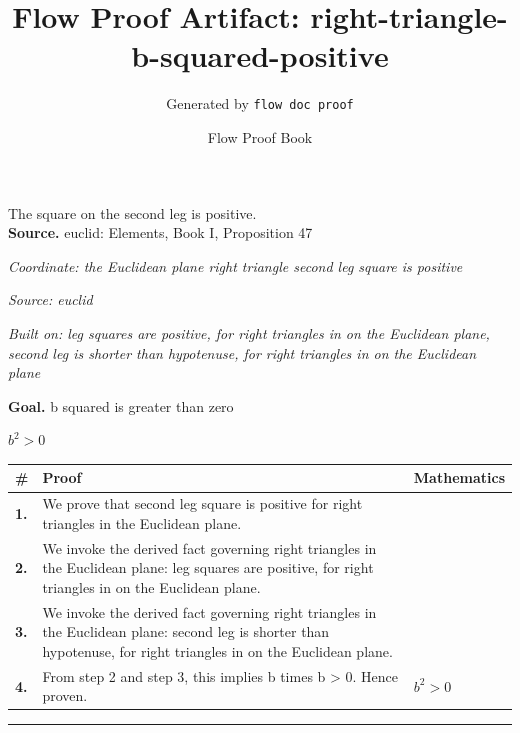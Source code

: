 \documentclass[11pt]{article}
\title{Flow Proof Artifact: right-triangle-b-squared-positive}
\author{Generated by \texttt{flow doc proof}}
\date{Flow Proof Book}
\theoremstyle{definition}
\begin{document}
\maketitle
The square on the second leg is positive.\\[0.5em]
\textbf{Source.} euclid: Elements, Book I, Proposition 47\\[0.5em]
\bigskip
{}\par
\smallskip\noindent\textit{Coordinate: the Euclidean plane \cdot right triangle \cdot second leg square is positive}\par
\smallskip\noindent\textit{Source: euclid}\par
\smallskip\noindent\textit{Built on: leg squares are positive, for right triangles in on the Euclidean plane, second leg is shorter than hypotenuse, for right triangles in on the Euclidean plane}\par
\medskip
\noindent\textbf{Goal.} b squared is greater than zero\par
\noindent$\displaystyle b^{2} > 0$\par
\medskip
\noindent
\begin{tabular}{@{} >{\raggedright\arraybackslash}p{} >{\raggedright\arraybackslash}p{} >{\raggedleft\arraybackslash}p{} @{}}
\textbf{\#} & \textbf{Proof} & \textbf{Mathematics} \\
\midrule
\textbf{1.} & We prove that second leg square is positive for right triangles in the Euclidean plane. & \\[0.45em]
\textbf{2.} & We invoke the derived fact governing right triangles in the Euclidean plane: leg squares are positive, for right triangles in on the Euclidean plane. & \\[0.45em]
\textbf{3.} & We invoke the derived fact governing right triangles in the Euclidean plane: second leg is shorter than hypotenuse, for right triangles in on the Euclidean plane. & \\[0.45em]
\textbf{4.} & From step 2 and step 3, this implies b times b > 0. Hence proven. & $\displaystyle b^{2} > 0$ \\[0.45em]
\bottomrule
\end{tabular}
\label{thm:Geometry-right triangle-second_leg_square_is_positive}
\par\medskip\hrule
\end{document}
